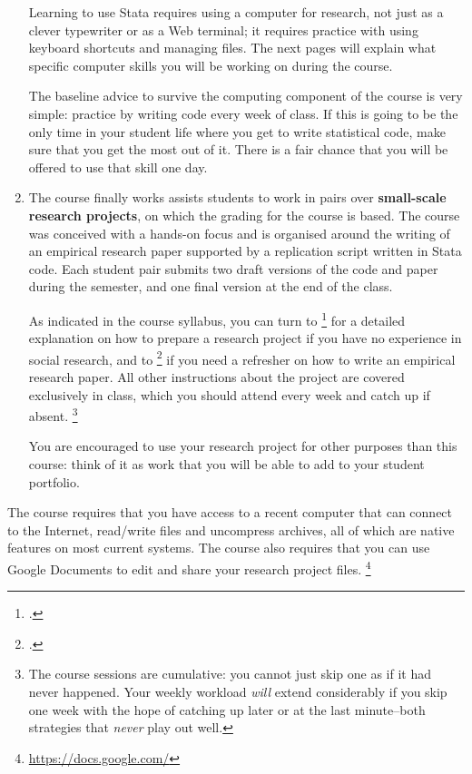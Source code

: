 \begin{enumerate}
		Learning to use Stata requires using a computer for research, not just as a clever typewriter or as a Web terminal; it requires practice with using keyboard shortcuts and managing files. The next pages will explain what specific computer skills you will be working on during the course.%
		
		The baseline advice to survive the computing component of the course is very simple: practice by writing code every week of class. If this is going to be the only time in your student life where you get to write statistical code, make sure that you get the most out of it. There is a fair chance that you will be offered to use that skill one day.%


  \item The course finally works assists students to work in pairs over \textbf{small-scale research projects}, on which the grading for the course is based. %
		The course was conceived with a hands-on focus and is organised around the  writing of an empirical research paper supported by a replication script written in Stata code. Each student pair submits two draft versions of the code and paper during the semester, and one final version at the end of the class.%
		
		As indicated in the course syllabus, you can turn to \footcite{BoothWilliams:2003v} for a detailed explanation on how to prepare a research project if you have no experience in social research, and to \footcite{White:2005a} if you need a refresher on how to write an empirical research paper. All other instructions about the project are covered exclusively in class, which you should attend every week and catch up if absent.%
		\footnote{The course sessions are cumulative: you cannot just skip one as if it had never happened. Your weekly workload \emph{will} extend considerably if you skip one week with the hope of catching up later or at the last minute–both strategies that \emph{never} play out well.}%
		
		You are encouraged to use your research project for other purposes than this course: think of it as work that you will be able to add to your student portfolio.%

\end{enumerate}

	The course requires that you have access to a recent computer that can connect to the Internet, read/write \PDF files and uncompress \ZIP archives, all of which are native features on most current systems. The course also requires that you can use Google Documents to edit and share your research project files.%
	\footnote{\url{https://docs.google.com/}}%


